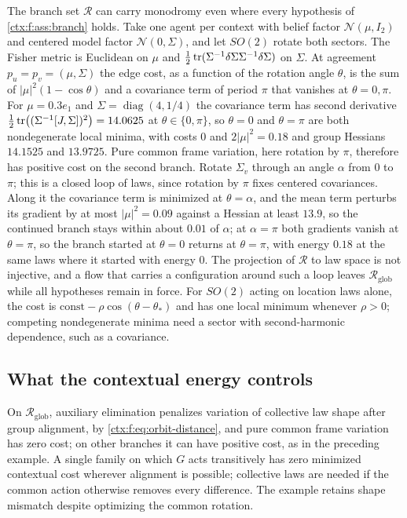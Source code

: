 The branch set $\mathcal R$ can carry monodromy even where every hypothesis of \cref{ctx:f:ass:branch} holds. Take one agent per context with belief factor $\mathcal N(\mu,I_2)$ and centered model factor $\mathcal N(0,\Sigma)$, and let $SO(2)$ rotate both sectors. The Fisher metric is Euclidean on $\mu$ and $\tfrac12\operatorname{tr}(\Sigma^{-1}\delta\Sigma\Sigma^{-1}\delta\Sigma)$ on $\Sigma$. At agreement $p_u=p_v=(\mu,\Sigma)$ the edge cost, as a function of the rotation angle $\theta$, is the sum of $|\mu|^2(1-\cos\theta)$ and a covariance term of period $\pi$ that vanishes at $\theta=0,\pi$. For $\mu=0.3e_1$ and $\Sigma=\operatorname{diag}(4,1/4)$ the covariance term has second derivative $\tfrac12\operatorname{tr}\bigl((\Sigma^{-1}[J,\Sigma])^2\bigr)=14.0625$ at $\theta\in\{0,\pi\}$, so $\theta=0$ and $\theta=\pi$ are both nondegenerate local minima, with costs $0$ and $2|\mu|^2=0.18$ and group Hessians $14.1525$ and $13.9725$. Pure common frame variation, here rotation by $\pi$, therefore has positive cost on the second branch. Rotate $\Sigma_v$ through an angle $\alpha$ from $0$ to $\pi$; this is a closed loop of laws, since rotation by $\pi$ fixes centered covariances. Along it the covariance term is minimized at $\theta=\alpha$, and the mean term perturbs its gradient by at most $|\mu|^2=0.09$ against a Hessian at least $13.9$, so the continued branch stays within about $0.01$ of $\alpha$; at $\alpha=\pi$ both gradients vanish at $\theta=\pi$, so the branch started at $\theta=0$ returns at $\theta=\pi$, with energy $0.18$ at the same laws where it started with energy $0$. The projection of $\mathcal R$ to law space is not injective, and a flow that carries a configuration around such a loop leaves $\mathcal R_{\mathrm{glob}}$ while all hypotheses remain in force. For $SO(2)$ acting on location laws alone, the cost is $\mathrm{const}-\rho\cos(\theta-\theta_*)$ and has one local minimum whenever $\rho>0$; competing nondegenerate minima need a sector with second-harmonic dependence, such as a covariance.

\subsection{What the contextual energy controls}

On $\mathcal R_{\mathrm{glob}}$, auxiliary elimination penalizes variation of collective law shape after group alignment, by \cref{ctx:f:eq:orbit-distance}, and pure common frame variation has zero cost; on other branches it can have positive cost, as in the preceding example. A single family on which $G$ acts transitively has zero minimized contextual cost wherever alignment is possible; collective laws are needed if the common action otherwise removes every difference. The example retains shape mismatch despite optimizing the common rotation.

